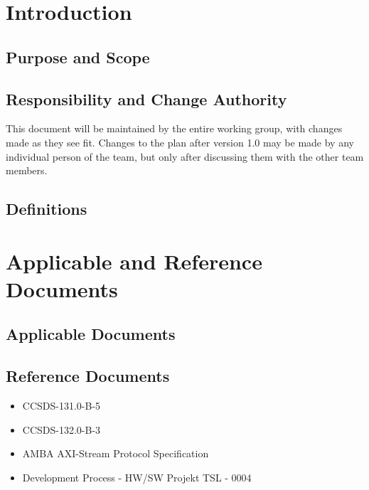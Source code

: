 \chapter{Introduction}	


\section{Purpose and Scope}


\section{Responsibility and Change Authority}

This document will be maintained by the entire working group, with changes made as they see fit. Changes to the plan after version 1.0 may be made by any individual person of the team, but only after discussing them with the other team members.

\section{Definitions}





\chapter{Applicable and Reference Documents}

\section{Applicable Documents}
\section{Reference Documents}
\begin{itemize}
	\item CCSDS-131.0-B-5
	\item CCSDS-132.0-B-3
	\item AMBA AXI-Stream Protocol Specification
	\item Development Process - HW/SW Projekt TSL - 0004
\end{itemize}
